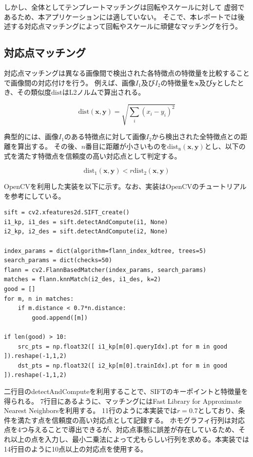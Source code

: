 しかし、全体としてテンプレートマッチングは回転やスケールに対して
虚弱であるため、本アプリケーションには適していない。
そこで、本レポートでは後述する対応点マッチングによって回転やスケールに頑健なマッチングを行う。

\subsection{対応点マッチング}
対応点マッチングは異なる画像間で検出された各特徴点の特徴量を比較することで画像間の対応付けを行う。
例えば、画像$I_1$及び$I_2$の特徴量を$\bm{x}$及び$\bm{y}$としたとき、その類似度$\mathrm{dist}$はL2ノルムで算出される。

\begin{equation}
    \mathrm{dist}(\bm{x}, \bm{y}) = \sqrt{\sum_{i}(x_i - y_i)^2}
\end{equation}

典型的には、画像$I_1$のある特徴点に対して画像$I_2$から検出された全特徴点との距離を算出する。
その後、$n$番目に距離が小さいものを$\mathrm{dist_n}(\bm{x}, \bm{y})$とし、以下の式を満たす特徴点を信頼度の高い対応点として判定する。\cite{cv}

\begin{equation}
    \mathrm{dist_1}(\bm{x}, \bm{y}) < r \mathrm{dist_2}(\bm{x}, \bm{y})
\end{equation}

OpenCVを利用した実装を以下に示す。なお、実装はOpenCVのチュートリアル\cite{sift_tut}を参考にしている。

\begin{lstlisting}[caption=対応点マッチング, label=py:sift_match]
sift = cv2.xfeatures2d.SIFT_create()
i1_kp, i1_des = sift.detectAndCompute(i1, None)
i2_kp, i2_des = sift.detectAndCompute(i2, None)

index_params = dict(algorithm=flann_index_kdtree, trees=5)
search_params = dict(checks=50)
flann = cv2.FlannBasedMatcher(index_params, search_params)
matches = flann.knnMatch(i2_des, i1_des, k=2)
good = []
for m, n in matches:
    if m.distance < 0.7*n.distance:
        good.append([m])

if len(good) > 10:
    src_pts = np.float32([ i1_kp[m[0].queryIdx].pt for m in good ]).reshape(-1,1,2)
    dst_pts = np.float32([ i2_kp[m[0].trainIdx].pt for m in good ]).reshape(-1,1,2)
\end{lstlisting}
二行目のdetectAndComputeを利用することで、SIFTのキーポイントと特徴量を得られる。
7行目にあるように、マッチングにはFast Library for Approximate Nearest Neighbors\cite{flann}を利用する。
11行のように本実装では$r=0.7$としており、条件を満たす点を信頼度の高い対応点として記録する。
ホモグラフィ行列は対応点を4つ与えることで導出できるが、対応点事態に誤差が存在しているため、それ以上の点を入力し、最小二乗法によって尤もらしい行列を求める。本実装では14行目のように10点以上の対応点を使用する。

